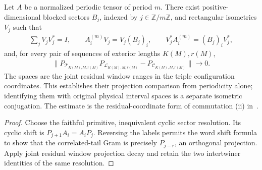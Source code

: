 \begin{lemma}
    \label{thm:periodic_residual_window_joint_projection_decay}
    \leanok
    Let $A$ be a normalized periodic tensor of period $m$. There exist
    positive-dimensional blocked sectors $B_j$, indexed by $j\in\mathbb Z/m\mathbb Z$,
    and rectangular isometries $V_j$ such that
    \begin{align}
        \sum_jV_jV_j^*=I,\qquad A^{(m)}_iV_j=V_j(B_j)_i,
        \qquad V_j^*A^{(m)}_i=(B_j)_iV_j^*,
    \end{align}
    and, for every pair of sequences of exterior lengths $K(M),r(M)$,
    \begin{align}
        \|P_{\mathcal T_{K(M),M,r(M)}}P_{\mathcal L_{K(M),M,r(M)}}
        -P_{\mathcal C_{K(M),M,r(M)}}\|\longrightarrow0.
    \end{align}
    The spaces are the joint residual window ranges in the triple configuration
    coordinates. This establishes their projection comparison from periodicity
    alone; identifying them with original physical interval spaces is a separate
    isometric conjugation. The estimate is the residual-coordinate form of
    commutation (ii) in~\cite{Nachtergaele1996Spectral}.
\end{lemma}
\begin{proof}\leanok
    Choose the faithful primitive, inequivalent cyclic sector resolution.
    Its cyclic shift is $P_{j+1}A_i=A_iP_j$. Reversing the labels permits the
    word shift formula to show that the correlated-tail Gram is precisely
    $P_{j-r}$, an orthogonal projection. Apply joint residual window projection
    decay and retain the two intertwiner identities of the same resolution.
\end{proof}

